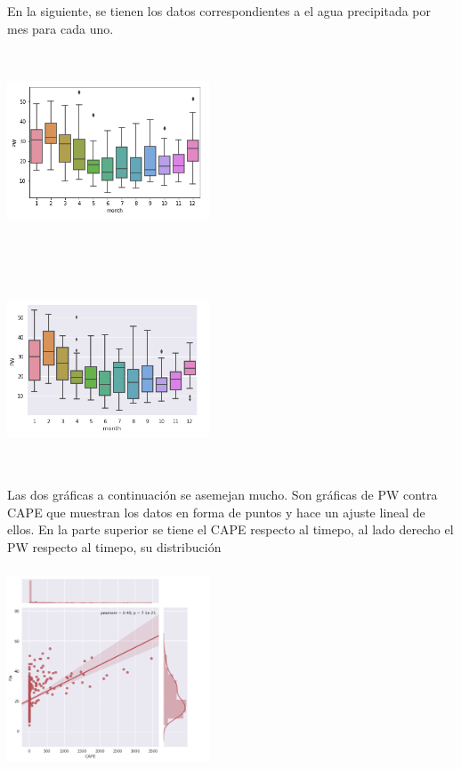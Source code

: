 \documentclass{article}
\begin{document}
En la siguiente, se tienen los datos correspondientes a el agua precipitada por mes para cada uno. 

\begin{center}
  \includegraphics[width=6cm, height=6cm]{PWbotGrafica.png}
\end{center}

\begin{center}
  \includegraphics[width=6cm, height=6cm]{PWboxGraficaZ.png}
\end{center}

Las dos gráficas a continuación se asemejan mucho. Son gráficas de PW contra CAPE que muestran los datos en forma de puntos y hace un ajuste lineal de ellos. En la parte superior se tiene el CAPE respecto al timepo, al lado derecho el PW respecto al timepo, su distribución
\begin{center}
  \includegraphics[width=6cm, height=6cm]{dispersosGrafica.png}
\end{center}
\end{document}

